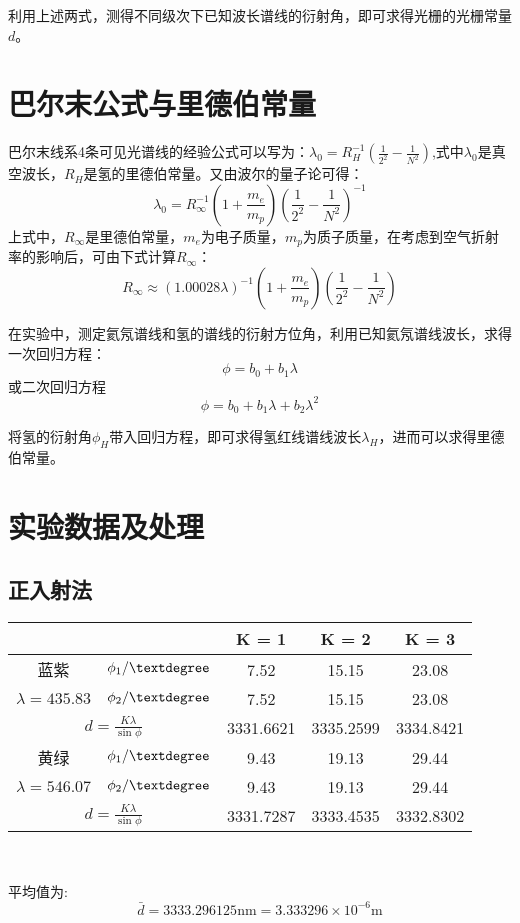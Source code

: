 \documentclass[10pt,a4paper,nocap]{ctexart}
\begin{document}
		 利用上述两式，测得不同级次下已知波长谱线的衍射角，即可求得光栅的光栅常量\(d\)。
		\section{巴尔末公式与里德伯常量}
		巴尔末线系4条可见光谱线的经验公式可以写为：\(\displaystyle \lambda_0 = R_H^{-1}\left(\frac{1}{2^2} - \frac{1}{N^2}\right)\),式中\(\lambda_0\)是真空波长，\(R_H\)是氢的里德伯常量。又由波尔的量子论可得：\[\lambda_0 = R_{\infty}^{-1}(1 + \frac{m_e}{m_p})(\frac{1}{2^2} - \frac{1}{N^2})^{-1}\]
		上式中，\(R_\infty\)是里德伯常量，\(m_e\)为电子质量，\(m_p\)为质子质量，在考虑到空气折射率的影响后，可由下式计算\(R_\infty\)：
		\[R_\infty \approx (1.00028\lambda)^{-1}(1 + \frac{m_e}{m_p})\left(\frac{1}{2^2} - \frac{1}{N^2}\right)\]
		
		在实验中，测定氦氖谱线和氢的谱线的衍射方位角，利用已知氦氖谱线波长，求得一次回归方程：\[\phi =b_0 + b_1\lambda\]
		或二次回归方程\[\phi = b_0 + b_1\lambda + b_2\lambda^2\]
		
		将氢的衍射角\(\phi_H\)带入回归方程，即可求得氢红线谱线波长\(\lambda_H\)，进而可以求得里德伯常量。
		\section{实验数据及处理}
		\subsection{正入射法}\begin{center}
			
		\begin{tabular}{ |c |c| c| c| c| }\hline
		 \multicolumn{2}{|c|}{} & K = 1	& K = 2	& K = 3\\ \hline
		蓝紫&\(\phi_1/\textdegree\) & 7.52  & 15.15  & 23.08 \\ \cline{2-5}
		\(\lambda = 435.83\) &\(\phi_2/\textdegree\) &  7.52 & 15.15 & 23.08\\ \hline 
		 \multicolumn{2}{|c|}{\(d = \frac{K\lambda}{\sin\phi}\)} &3331.6621& 3335.2599& 3334.8421\\ \hline
		黄绿&\(\phi_1/\textdegree\) &  9.43 & 19.13 & 29.44 \\ \cline{2-5}
		 \(\lambda = 546.07\)& \(\phi_2/\textdegree\) & 9.43 & 19.13 & 29.44 \\ \hline
		 \multicolumn{2}{|c|}{\(d = \frac{K\lambda}{\sin\phi}\)} & 3331.7287 & 3333.4535 & 3332.8302\\ \hline
		 \end{tabular}\\
		\end{center}
		平均值为:
		\[\bar{d} = 3333.296125 \mathrm{nm} = 3.333296 \times10^{-6} \mathrm{m}\]
\end{document}
